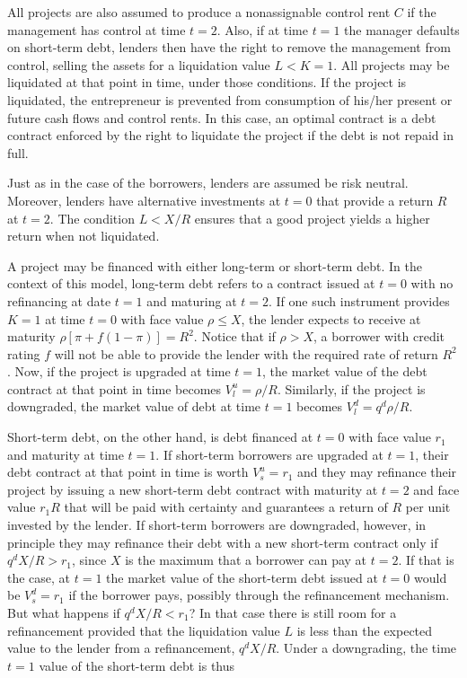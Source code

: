 \documentclass[11pt,a4paper]{article}
\begin{document}
All projects are also assumed to produce a nonassignable control rent \(C\) if the management has
control at time \(t = 2\). Also, if at time \(t = 1\) the manager defaults on short-term debt,
lenders then have the right to remove the management from control, selling the assets for a
liquidation value \(L < K = 1\). All projects may be liquidated at that point in time, under those
conditions. If the project is liquidated, the entrepreneur is prevented from consumption of his/her
present or future cash flows and control rents. In this case, an optimal contract is a debt contract
enforced by the right to liquidate the project if the debt is not repaid in full.

Just as in the case of the borrowers, lenders are assumed be risk neutral. Moreover, lenders have
alternative investments at \(t = 0\) that provide a return \(R\) at \(t = 2\). The condition
\(L < X/R\) ensures that a good project yields a higher return when not liquidated.

A project may be financed with either long-term or short-term debt. In the context of this model,
long-term debt refers to a contract issued at \(t = 0\) with no refinancing at date \(t = 1\) and
maturing at \(t = 2\). If one such instrument provides \(K = 1\) at time \(t = 0\) with face value
\(\rho \le X\), the lender expects to receive at maturity \(\rho[\pi + f(1 - \pi)] = R^2\). Notice
that if \(\rho > X\), a borrower with credit rating \(f\) will not be able to provide the lender
with the required rate of return \(R^2\). Now, if the project is upgraded at time \(t = 1\), the
market value of the debt contract at that point in time becomes \(V_l^u = \rho/R\). Similarly, if
the project is downgraded, the market value of debt at time \(t = 1\) becomes \(V_l^d = q^d\rho/R\).

Short-term debt, on the other hand, is debt financed at \(t = 0\) with face value \(r_1\) and
maturity at time \(t = 1\). If short-term borrowers are upgraded at \(t = 1\), their debt contract
at that point in time is worth \(V_s^u = r_1\) and they may refinance their project by issuing a new
short-term debt contract with maturity at \(t = 2\) and face value \(r_1 R\) that will be paid with
certainty and guarantees a return of \(R\) per unit invested by the lender. If short-term borrowers
are downgraded, however, in principle they may refinance their debt with a new short-term contract
only if \(q^d X/R > r_1\), since \(X\) is the maximum that a borrower can pay at \(t = 2\). If that
is the case, at \(t = 1\) the market value of the short-term debt issued at \(t = 0\) would be
\(V_s^d = r_1\) if the borrower pays, possibly through the refinancement mechanism. But what happens
if \(q^d X/R < r_1\)? In that case there is still room for a refinancement provided that the
liquidation value \(L\) is less than the expected value to the lender from a refinancement,
\(q^d X/R\). Under a downgrading, the time \(t = 1\) value of the short-term debt is thus
\end{document}
